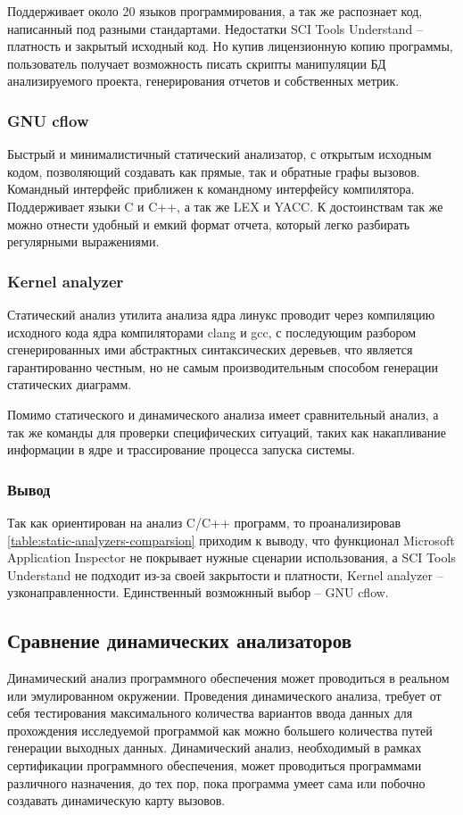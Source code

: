 Поддерживает около 20 языков программирования, а так же распознает код, написанный под разными 
стандартами.
Недостатки SCI Tools Understand -- платность и закрытый исходный код. Но купив лицензионную копию
программы, пользователь получает возможность писать скрипты манипуляции БД анализируемого проекта, 
генерирования отчетов и собственных метрик.

\subsubsection{GNU cflow}\label{sec:ch1/sec3/sub1/sub3}
Быстрый и минималистичный статический анализатор, с открытым исходным кодом,
позволяющий создавать как прямые, так и обратные графы вызовов. 
Командный интерфейс приближен к командному интерфейсу компилятора.
Поддерживает языки C и C++, а так же LEX и YACC.
К достоинствам так же можно отнести удобный и емкий формат отчета, который легко
разбирать регулярными выражениями.

\subsubsection{Kernel analyzer}\label{sec:ch1/sec3/sub1/sub3}
Статический анализ утилита анализа ядра линукс проводит через
компиляцию исходного кода ядра компиляторами clang и gcc, с последующим
разбором сгенерированных ими абстрактных синтаксических деревьев,
что является гарантированно честным, но не самым производительным способом
генерации статических диаграмм.

Помимо статического и динамического
анализа имеет сравнительный анализ,
а так же команды для проверки специфических ситуаций,
таких как накапливание информации в ядре и 
трассирование процесса запуска системы.

\subsubsection{Вывод}\label{sec:ch1/sec3/sub1/sub4}
Так как {\ProgModule} ориентирован на анализ C/C++ программ, то проанализировав
\autoref{table:static-analyzers-comparsion} приходим к выводу, что функционал 
Microsoft Application Inspector не покрывает нужные сценарии использования, 
а SCI Tools Understand не подходит из-за своей закрытости и платности, Kernel analyzer -- узконаправленности.
Единственный возможнный выбор -- GNU cflow. 

\subsection{Сравнение динамических анализаторов}\label{sec:ch1/sec3/sub2}
Динамический анализ программного обеспечения может проводиться в реальном
или эмулированном окружении. Проведения динамического
анализа, требует от себя тестирования максимального количества вариантов
ввода данных для прохождения исследуемой программой как можно большего количества путей генерации 
выходных данных.
Динамический анализ, необходимый в рамках сертификации программного обеспечения, может проводиться
программами различного назначения, до тех пор, пока программа умеет сама или побочно
создавать динамическую карту вызовов.


